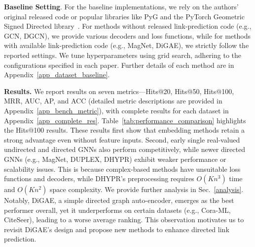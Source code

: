 \textbf{Baseline Setting}. 
For the baseline implementations, we rely on the authors’ original released code or popular libraries like PyG and the PyTorch Geometric Signed Directed library~\cite{dpyg}. For methods without released link-prediction code (e.g., GCN, DGCN), we provide various decoders and loss functions, while for methods with available link-prediction code (e.g., MagNet, DiGAE), we strictly follow the reported settings. We tune hyperparameters using grid search, adhering to the configurations specified in each paper. Further details of each method are in Appendix~\ref{app_dataset_baseline}.


\textbf{Results.} 
We report results on seven metrics—Hits@20, Hits@50, Hits@100, MRR, AUC, AP, and ACC (detailed metric descriptions are provided in Appendix~\ref{app_bench_metric}), with complete results for each dataset in Appendix~\ref{app_complete_res}. Table~\ref{tab:performance_comparison} highlights the Hits@100 results. These results first show that embedding methods retain a strong advantage even without feature inputs. Second, early single real-valued undirected and directed GNNs also perform competitively, while newer directed GNNs (e.g., MagNet, DUPLEX, DHYPR) exhibit weaker performance or scalability issues. This is because complex-based methods have unsuitable loss functions and decoders, while DHYPR’s preprocessing requires $O(Kn^3)$ time and $O(Kn^2)$ space complexity. We provide further analysis in Sec.~\ref{analysis}. Notably, DiGAE, a simple directed graph auto-encoder, emerges as the best performer overall, yet it underperforms on certain datasets (e.g., Cora-ML, CiteSeer), leading to a worse average ranking. This observation motivates us to revisit DiGAE’s design and propose new methods to enhance directed link prediction.

